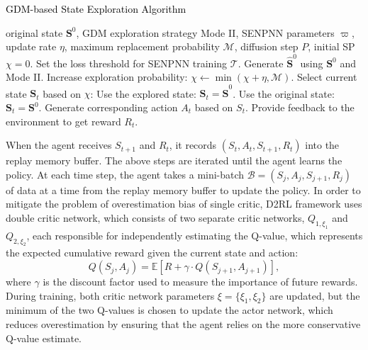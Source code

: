 \documentclass[comsoc,journal]{IEEEtran}
\begin{document}
\begin{algorithm}[t]
   \caption{\textcolor{black}{GDM-based State Exploration Algorithm}}
   \label{alg:SENPNN_Exploration}
\begin{algorithmic}
 original state $\boldsymbol{S}^0$, GDM exploration strategy Mode II, SENPNN parameters $\varpi$, update rate $\eta$, maximum replacement probability $\mathcal{M}$, diffusion step $P$, initial SP $\chi=0$.
\STATE Set the loss threshold for SENPNN training $\mathcal{T}$.
\STATE Generate $\boldsymbol\hat{S}^{0}$ using $\boldsymbol{S}^0$ and Mode II.
        \STATE Increase exploration probability: $\chi \leftarrow \min(\chi + \eta, \mathcal{M})$.
    \ENDIF
\STATE Select current state $\boldsymbol{S}_t$ based on $\chi$:
        \STATE Use the explored state: $\boldsymbol{S}_t = \boldsymbol\hat{S}^{0}$.
    \ELSE
        \STATE Use the original state: $\boldsymbol{S}_t = \boldsymbol{S}^0$.
    \ENDIF
\STATE Generate corresponding action $A_t$ based on $S_t$.
\STATE Provide feedback to the environment to get reward $R_t$.
\end{algorithmic}
\end{algorithm}
\setlength{\textfloatsep}{3pt} 
When the agent receives $S_{t+1}$ and $R_t$, it records $(S_t,A_t,S_{t+1},R_t)$ into the replay memory buffer. The above steps are iterated until the agent learns the policy.
At each time step, the agent takes a mini-batch $\mathcal{B}=
(S_j,A_j,S_{j+1},R_j)$ of data at a time from the replay memory buffer to update the policy\cite{yu2024attention}. In order to mitigate the problem of overestimation bias of single critic, D2RL framework uses double critic network, which consists of two separate critic networks, $Q_{1,\xi_1}$ and $Q_{2,\xi_2}$, each responsible for independently estimating the Q-value, which represents the expected cumulative reward given the current state and action:
\begin{equation}\label{eq: Q}
    Q(S_j, A_j) = \mathbb{E}\left[R + \gamma \cdot Q(S_{j+1}, A_{j+1})\right],
\end{equation}
where $\gamma$ is the discount factor used to measure the importance of future rewards.
During training, both critic network parameters $\xi=\{\xi_1,\xi_2\}$ are updated, but the minimum of the two Q-values is chosen to update the actor network, which reduces overestimation by ensuring that the agent relies on the more conservative Q-value estimate.
\end{document}
